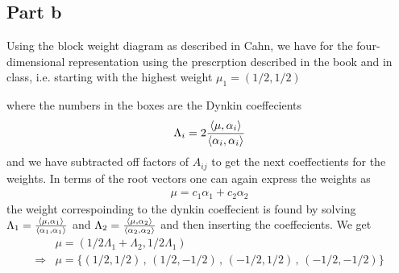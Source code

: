 \documentclass[a4paper,12pt]{article}
\begin{document}
\subsection*{Part b}
Using the block weight diagram as described in Cahn, we have for the four-dimensional representation using the prescrption described in the book and in class, i.e. starting with the highest weight $\mu_1=(1/2,1/2)$
\begin{figure}[H]\centering
\end{figure}
where the numbers in the boxes are the Dynkin coeffecients
\begin{equation}
	\begin{aligned}
		\Lambda_{i}=2\frac{\expval{\mu,\alpha_i}}{\expval{\alpha_i,\alpha_i}}
	\end{aligned}
\end{equation}
and we have subtracted off factors of $A_{ij}$ to get the next coeffectients for the weights. In terms of the root vectors one can again express the weights as
\begin{equation}
	\begin{aligned}
		\mu=c_1 \alpha_1+c_2\alpha_2
	\end{aligned}
\end{equation}
the weight correspoinding to the dynkin coeffecient is found by solving $\Lambda_1= \frac{\expval{\mu,\alpha_1}}{\expval{\alpha_1,\alpha_1}} $ and $\Lambda_2= \frac{\expval{\mu,\alpha_2}}{\expval{\alpha_2,\alpha_2}} $ and then inserting the coeffecients. We get
\begin{equation}
	\begin{aligned}
	&\mu=\left(1/2 \Lambda_1+\Lambda_{2},1/2\Lambda_1\right)\\	
	\Rightarrow&\mu=\{(1/2,1/2)\,,\,(1/2,-1/2)\,,\,(-1/2,1/2)\,,\,(-1/2,-1/2)\}
	\end{aligned}
\end{equation}
\end{document}
